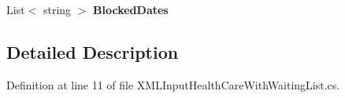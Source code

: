 \begin{DoxyCompactItemize}
\item 
List$<$ string $>$ {\bfseries Blocked\+Dates}\hypertarget{class_general_health_care_elements_1_1_input_1_1_x_m_l_input_health_care_with_waiting_list_a40301c3973fb47e93c6a16ae37d82b11}{}\label{class_general_health_care_elements_1_1_input_1_1_x_m_l_input_health_care_with_waiting_list_a40301c3973fb47e93c6a16ae37d82b11}

\end{DoxyCompactItemize}


\subsection{Detailed Description}


Definition at line 11 of file X\+M\+L\+Input\+Health\+Care\+With\+Waiting\+List.\+cs.

